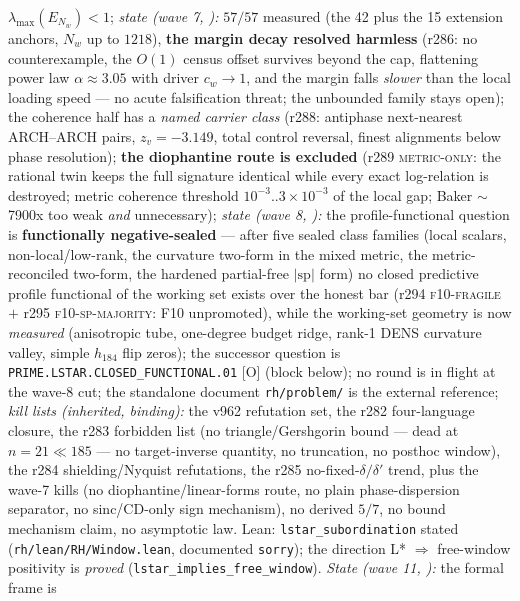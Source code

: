 \documentclass[11pt,a4paper]{article}
\begin{document}
{$\lambda_{\max}(E_{N_w}) < 1$; \emph{state (wave 7,
):} $57/57$ measured (the
42 plus the 15 extension anchors, $N_w$ up to $1218$), \textbf{the
margin decay resolved harmless} (r286: no counterexample, the
$O(1)$ census offset survives beyond the cap, flattening power
law $\alpha \approx 3.05$ with driver $c_w \to 1$, and the margin
falls \emph{slower} than the local loading speed --- no acute
falsification threat; the unbounded family stays open); the
coherence half has a \emph{named carrier class} (r288: antiphase
next-nearest ARCH--ARCH pairs, $z_v = -3.149$, total control
reversal, finest alignments below phase resolution); \textbf{the
diophantine route is excluded} (r289 \textsc{metric-only}: the
rational twin keeps the full signature identical while every
exact log-relation is destroyed; metric coherence threshold
$10^{-3}..3\times10^{-3}$ of the local gap; Baker $\sim$7900x too
weak \emph{and} unnecessary); \emph{state (wave 8,
):} the profile-functional
question is \textbf{functionally negative-sealed} --- after five
sealed class families (local scalars, non-local/low-rank, the
curvature two-form in the mixed metric, the metric-reconciled
two-form, the hardened partial-free $|\mathrm{sp}|$ form) no closed
predictive profile functional of the working set exists over the
honest bar (r294 \textsc{f10-fragile} $+$ r295
\textsc{f10-sp-majority}: F10 unpromoted), while the working-set
geometry is now \emph{measured} (anisotropic tube, one-degree
budget ridge, rank-1 DENS curvature valley, simple $h_{184}$ flip
zeros); the successor question is
\texttt{PRIME.LSTAR.\allowbreak CLOSED\_FUNCTIONAL.01} [O] (block
below); no round is in flight at the wave-8 cut; the
standalone document \texttt{rh/problem/} is the
external reference; \emph{kill lists (inherited, binding):} the
v962 refutation set, the r282 four-language closure, the r283
forbidden list (no triangle/Gershgorin bound --- dead at $n = 21
\ll 185$ --- no target-inverse quantity, no truncation, no
posthoc window), the r284 shielding/Nyquist refutations, the
r285 no-fixed-$\delta/\delta'$ trend, plus the wave-7 kills (no
diophantine/linear-forms route, no plain phase-dispersion
separator, no sinc/CD-only sign mechanism), no derived $5/7$, no
bound mechanism claim, no asymptotic law.  Lean:
\texttt{lstar\_subordination} stated
(\texttt{rh/lean/RH/Window.lean}, documented \texttt{sorry});
the direction L* $\Rightarrow$ free-window positivity is
\emph{proved} (\texttt{lstar\_implies\_free\_window}).
\emph{State (wave 11,
):} the formal frame is
}
\end{document}
